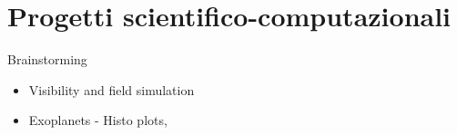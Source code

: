 \documentclass[main.tex]{subfiles}
\begin{document}
\section{Progetti scientifico-computazionali}

\begin{frame}{Brainstorming}
\begin{itemize}
    \item Visibility and field simulation
    \item Exoplanets - Histo plots, 
\end{itemize}
\end{frame}
\end{document}
